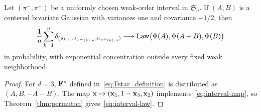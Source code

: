 \documentclass[11pt,letterpaper]{article}
\begin{document}
\begin{proposition}\label{prop:intervals}
      Let $(\pi^-,\pi^+)$ be a uniformly chosen weak-order interval in $\mathfrak S_n$. If $(A,B)$ is a centered bivariate Gaussian with variances one and covariance $-1/2$, then
      \begin{equation}\label{eq:interval-law}
            \frac1n\sum_{k=1}^n \delta_{(u_{k,n},u_{\pi^-(k),n},u_{\pi^+(k),n})} \longrightarrow \operatorname{Law}\bigl(\Phi(A),\Phi(A+B),\Phi(B)\bigr)
      \end{equation}
      in probability, with exponential concentration outside every fixed weak neighborhood.
\end{proposition}
\begin{proof}
      For $d=3$, $\mathbf F^\ast$ defined in~\eqref{eq:Fstar_definition} is distributed as $(A,B,-A-B)$. The map $\mathbf x\mapsto(\mathbf x_1,1-\mathbf x_3,\mathbf x_2)$ implements~\eqref{eq:interval-map}, so Theorem~\ref{thm:permuton} gives~\eqref{eq:interval-law}.
\end{proof}
\end{document}
